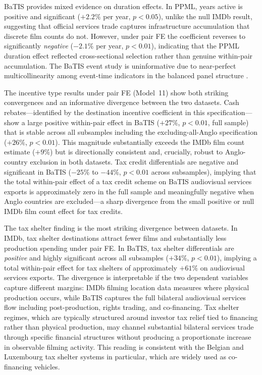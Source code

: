 BaTIS provides mixed evidence on duration effects. In PPML, years active is positive and significant ($+2.2\%$ per year, $p < 0.05$), unlike the null IMDb result, suggesting that official services trade captures infrastructure accumulation that discrete film counts do not. However, under pair FE the coefficient reverses to significantly \textit{negative} ($-2.1\%$ per year, $p < 0.01$), indicating that the PPML duration effect reflected cross-sectional selection rather than genuine within-pair accumulation. The BaTIS event study is uninformative due to near-perfect multicollinearity among event-time indicators in the balanced panel structure \citep{borusyak2024}.

The incentive type results under pair FE (Model~11) show both striking convergences and an informative divergence between the two datasets. Cash rebates---identified by the destination incentive coefficient in this specification---show a large positive within-pair effect in BaTIS ($+27\%$, $p < 0.01$, full sample) that is stable across all subsamples including the excluding-all-Anglo specification ($+26\%$, $p < 0.01$). This magnitude substantially exceeds the IMDb film count estimate ($+9\%$) but is directionally consistent and, crucially, robust to Anglo-country exclusion in both datasets. Tax credit differentials are negative and significant in BaTIS ($-25\%$ to $-44\%$, $p < 0.01$ across subsamples), implying that the total within-pair effect of a tax credit scheme on BaTIS audiovisual services exports is approximately zero in the full sample and meaningfully negative when Anglo countries are excluded---a sharp divergence from the small positive or null IMDb film count effect for tax credits.

The tax shelter finding is the most striking divergence between datasets. In IMDb, tax shelter destinations attract fewer films and substantially less production spending under pair FE. In BaTIS, tax shelter differentials are \textit{positive} and highly significant across all subsamples ($+34\%$, $p < 0.01$), implying a total within-pair effect for tax shelters of approximately $+61\%$ on audiovisual services exports. The divergence is interpretable if the two dependent variables capture different margins: IMDb filming location data measures where physical production occurs, while BaTIS captures the full bilateral audiovisual services flow including post-production, rights trading, and co-financing. Tax shelter regimes, which are typically structured around investor tax relief tied to financing rather than physical production, may channel substantial bilateral services trade through specific financial structures without producing a proportionate increase in observable filming activity. This reading is consistent with the Belgian and Luxembourg tax shelter systems in particular, which are widely used as co-financing vehicles.

